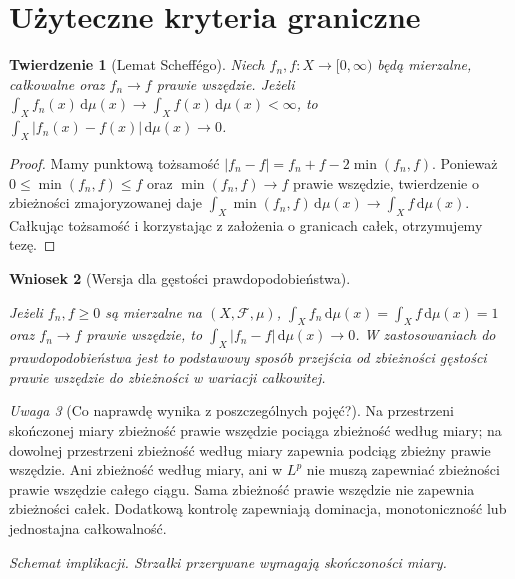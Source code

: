 \documentclass[11pt,a4paper,oneside]{book}
\numberwithin{equation}{chapter}
\theoremstyle{plain}
\newtheorem{twierdzenie}{Twierdzenie}[chapter]
\newtheorem{wniosek}[twierdzenie]{Wniosek}
\theoremstyle{definition}
\theoremstyle{remark}
\newtheorem{uwaga}[twierdzenie]{Uwaga}
\begin{document}
\section{Użyteczne kryteria graniczne}

\begin{twierdzenie}[Lemat Scheffégo]
\label{thm:scheffe-9}
Niech $f_n,f:X\to[0,\infty)$ będą mierzalne,
całkowalne oraz $f_n\to f$ prawie wszędzie.
Jeżeli
$\int_Xf_n(x)\,\mathrm d\mu(x)\to
\int_Xf(x)\,\mathrm d\mu(x)<\infty$,
to
$\int_X|f_n(x)-f(x)|\,\mathrm d\mu(x)\to0$.
\end{twierdzenie}
\begin{proof}
Mamy punktową tożsamość
$|f_n-f|=f_n+f-2\min(f_n,f)$.
Ponieważ $0\le\min(f_n,f)\le f$ oraz
$\min(f_n,f)\to f$ prawie wszędzie,
twierdzenie o zbieżności zmajoryzowanej daje
$\int_X\min(f_n,f)\,\mathrm d\mu(x)\to\int_Xf\,\mathrm d\mu(x)$.
Całkując tożsamość i korzystając z założenia
o granicach całek, otrzymujemy tezę.
\end{proof}

\begin{wniosek}[Wersja dla gęstości prawdopodobieństwa]\label{idx:09:wniosek:14}

Jeżeli $f_n,f\ge0$ są mierzalne na $(X,\mathcal F,\mu)$,
$\int_X f_n\,\mathrm d\mu(x)=
\int_X f\,\mathrm d\mu(x)=1$ oraz $f_n\to f$ prawie
wszędzie, to $\int_X|f_n-f|\,\mathrm d\mu(x)\to0$.
W zastosowaniach do prawdopodobieństwa jest to
podstawowy sposób przejścia od zbieżności gęstości
prawie wszędzie do zbieżności w wariacji całkowitej.
\end{wniosek}

\begin{uwaga}[Co naprawdę wynika z poszczególnych pojęć?]
\label{rem:conv-summary-9}
Na przestrzeni skończonej miary zbieżność prawie
wszędzie pociąga zbieżność według miary; na dowolnej
przestrzeni zbieżność według miary zapewnia podciąg
zbieżny prawie wszędzie. Ani zbieżność według miary,
ani w $L^p$ nie muszą zapewniać zbieżności prawie
wszędzie całego ciągu. Sama zbieżność prawie wszędzie
nie zapewnia zbieżności całek. Dodatkową kontrolę
zapewniają dominacja, monotoniczność lub jednostajna
całkowalność.
\end{uwaga}

\begin{center}
\par\smallskip\textit{Schemat implikacji. Strzałki przerywane wymagają skończoności miary.}
\end{center}
\end{document}
